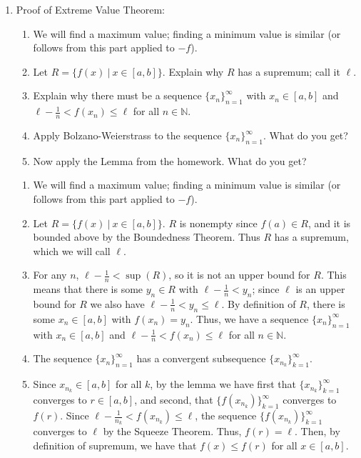 \documentclass[12pt]{amsart}
\newcommand{\N}{\mathbb{N}}
\numberwithin{equation}{section}
\theoremstyle{plain} %
\theoremstyle{definition}
\theoremstyle{remark}
\begin{document}
\begin{enumerate}
\item Proof of Extreme Value Theorem:
\begin{enumerate}
\item[\null] We will find a maximum value; finding a minimum value is similar (or follows from this part applied to $-f$).
\item Let $R = \{ f(x) \ |\  x\in [a,b]\}$. Explain why $R$ has a supremum; call it $\ell$.
\item Explain why there must be a sequence $\{x_n\}_{n=1}^\infty$ with $x_n\in[a,b]$ and $\ell- \frac{1}{n} <f(x_n)\leq \ell$ for all $n\in \N$.
\item Apply Bolzano-Weierstrass to the sequence $\{x_n\}_{n=1}^\infty$. What do you get?
\item Now apply the Lemma from the homework. What do you get?
\end{enumerate}

\begin{framed}
\begin{enumerate}
\item[\null] We will find a maximum value; finding a minimum value is similar (or follows from this part applied to $-f$).
\item Let $R = \{ f(x) \ |\  x\in [a,b]\}$. $R$ is nonempty since $f(a)\in R$, and it is bounded above by the Boundedness Theorem. Thus $R$ has a supremum, which we will call $\ell$.
\item For any $n$, $\ell-\frac{1}{n} < \sup(R)$, so it is not an upper bound for $R$. This means that there is some $y_n\in R$ with $\ell-\frac{1}{n} < y_n$; since $\ell$ is an upper bound for $R$ we also have $\ell-\frac{1}{n} < y_n\leq \ell$. By definition of $R$, there is some $x_n\in [a,b]$ with $f(x_n) = y_n$. Thus, we have a sequence $\{x_n\}_{n=1}^\infty$ with $x_n\in[a,b]$ and $\ell- \frac{1}{n} <f(x_n)\leq \ell$ for all $n\in \N$.
\item The sequence $\{x_n\}_{n=1}^\infty$ has a convergent subsequence $\{x_{n_k}\}_{k=1}^\infty$.
\item Since $x_{n_k}\in[a,b]$ for all $k$, by the lemma we have first that $\{x_{n_k}\}_{k=1}^\infty$ converges to $r\in [a,b]$, and second, that $\{f(x_{n_k})\}_{k=1}^\infty$ converges to $f(r)$. Since $ \ell - \frac{1}{n_k} < f(x_{n_k})\leq \ell $, the sequence $\{f(x_{n_k})\}_{k=1}^\infty$ converges to $\ell$ by the Squeeze Theorem. Thus, $f(r) = \ell$. Then, by definition of supremum, we have that $f(x)\leq f(r)$ for all $x\in[a,b]$.
\end{enumerate}
\end{framed}
\end{enumerate}
\end{document}

